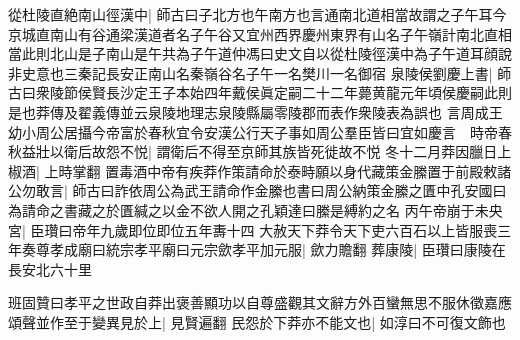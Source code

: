 從杜陵直絶南山徑漢中|{
	師古曰子北方也午南方也言通南北道相當故謂之子午耳今京城直南山有谷通梁漢道者名子午谷又宜州西界慶州東界有山名子午嶺計南北直相當此則北山是子南山是午共為子午道仲馮曰史文自以從杜陵徑漢中為子午道耳顔說非史意也三秦記長安正南山名秦嶺谷名子午一名樊川一名御宿}
泉陵侯劉慶上書|{
	師古曰衆陵節侯賢長沙定王子本始四年戴侯眞定嗣二十二年薨黄龍元年頃侯慶嗣此則是也莽傳及翟義傳並云泉陵地理志泉陵縣屬零陵郡而表作衆陵表為誤也}
言周成王幼小周公居攝今帝富於春秋宜令安漢公行天子事如周公羣臣皆曰宜如慶言　時帝春秋益壯以衛后故怨不悦|{
	謂衛后不得至京師其族皆死徙故不悦}
冬十二月莽因臘日上椒酒|{
	上時掌翻}
置毒酒中帝有疾莽作策請命於泰畤願以身代藏策金縢置于前殿敕諸公勿敢言|{
	師古曰詐依周公為武王請命作金縢也書曰周公納策金縢之匱中孔安國曰為請命之書藏之於匱緘之以金不欲人開之孔穎達曰縢是縛約之名}
丙午帝崩于未央宮|{
	臣瓚曰帝年九歲即位即位五年夀十四}
大赦天下莽令天下吏六百石以上皆服喪三年奏尊孝成廟曰統宗孝平廟曰元宗歛孝平加元服|{
	歛力贍翻}
葬康陵|{
	臣瓚曰康陵在長安北六十里}


班固贊曰孝平之世政自莽出褒善顯功以自尊盛觀其文辭方外百蠻無思不服休徵嘉應頌聲並作至于變異見於上|{
	見賢遍翻}
民怨於下莽亦不能文也|{
	如淳曰不可復文飾也}



